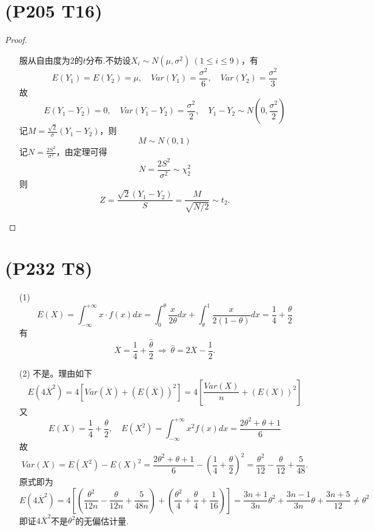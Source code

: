 \documentclass{article}
\begin{document}
\section{(P205 T16)}  %
\begin{proof}
    \begin{enumerate}
        \item []
        \item []服从自由度为$2$的$t$分布.不妨设$X_i \sim N(\mu, \sigma^2)\ (1\leq i\leq 9)$，有
        \[
            E(Y_1) = E(Y_2) = \mu,\quad
            Var(Y_1) = \frac{\sigma^2}{6},\quad
            Var(Y_2) = \frac{\sigma^2}{3}
        \]
        故
        \[
            E(Y_1 - Y_2) = 0,\quad
            Var(Y_1 - Y_2) = \frac{\sigma^2}{2},\quad
            Y_1 - Y_2 \sim N(0, \frac{\sigma^2}{2})  
        \]
        记$M = \frac{\sqrt{2}}{\sigma} (Y_1 - Y_2)$，则
        \[
            M \sim N(0,1)    
        \]
        记$N = \frac{2 S^2}{\sigma^2}$，由定理可得
        \[
            N = \frac{2 S^2}{\sigma^2} \sim \chi_{2}^2
        \]
        则
        \[
            Z = \frac{\sqrt{2} (Y_1 - Y_2)}{S} = \frac{M}{\sqrt{N/2}} \sim t_2 .
        \]
    \end{enumerate}
\end{proof}


\section{(P232 T8)}  %
\begin{enumerate}
    \item [(1)]
    \[
        E(X) 
        = \int_{-\infty}^{+\infty} x \cdot f(x) dx   
        = \int_{0}^{\theta} \frac{x}{2\theta} dx + \int_{\theta}^{1} \frac{x}{2(1-\theta)} dx
        = \frac{1}{4} + \frac{\theta}{2}
    \]
    有
    \[
        \overline{X} = \frac{1}{4} + \frac{\widehat{\theta} }{2} 
        \ \Rightarrow\ 
        \widehat{\theta} = 2 \overline{X} - \frac{1}{2} .
    \]
    \item [(2)]不是。理由如下
    \[
        E(4 \overline{X}^2) 
        = 4 \left[ Var(\overline{X}) + {\left( E(\overline{X}) \right)}^2 \right] 
        = 4 \left[ \frac{Var(X)}{n} + {\left( E(X) \right)}^2 \right]
    \]
    又
    \[
        E(X) = \frac{1}{4} + \frac{\theta}{2},\quad
        E(X^2) = \int_{-\infty}^{+\infty} x^2 f(x) dx = \frac{2\theta^2 + \theta + 1}{6}  
    \]
    故
    \[
        Var(X) 
        = E(X^2) - {E(X)}^2
        = \frac{2\theta^2 + \theta + 1}{6} - {\left(\frac{1}{4} + \frac{\theta}{2} \right)}^2
        = \frac{\theta^2}{12} - \frac{\theta}{12} + \frac{5}{48}.
    \]
    原式即为
    \[
        E(4 \overline{X}^2) 
        = 4 \left[\left( \frac{\theta^2}{12n} - \frac{\theta}{12n} + \frac{5}{48n} \right) + \left( \frac{\theta^2}{4} + \frac{\theta}{4} + \frac{1}{16} \right)\right]
        = \frac{3n + 1}{3n} \theta^2 + \frac{3n-1}{3n} \theta + \frac{3n+5}{12}
        \neq \theta^2
    \]
    即证$4 \overline{X}^2$不是$\theta^2$的无偏估计量.
\end{enumerate}
\end{document}
